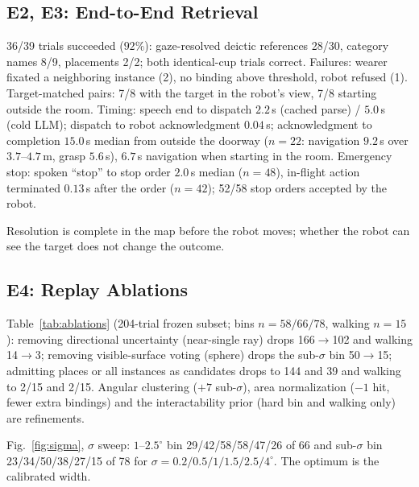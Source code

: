 \subsection{E2, E3: End-to-End Retrieval}
\label{sec:end_to_end_results}

36/39 trials succeeded ($92\%$): gaze-resolved deictic references
28/30, category names 8/9, placements 2/2; both identical-cup
trials correct. Failures: wearer fixated a neighboring instance
(2), no binding above threshold, robot refused (1). Target-matched
pairs: 7/8 with the target in the robot's view, 7/8 starting outside
the room. Timing: speech end to dispatch $2.2$\,s (cached parse) / $5.0$\,s
(cold LLM); dispatch to robot acknowledgment $0.04$\,s; acknowledgment
to completion $15.0$\,s median from outside the doorway ($n{=}22$:
navigation $9.2$\,s over $3.7$--$4.7$\,m, grasp $5.6$\,s), $6.7$\,s
navigation when starting in the room. Emergency stop: spoken
``stop'' to stop order $2.0$\,s median ($n{=}48$), in-flight action
terminated $0.13$\,s after the order ($n{=}42$); 52/58 stop orders
accepted by the robot.

Resolution is complete in the map before the robot moves; whether
the robot can see the target does not change the outcome.

\subsection{E4: Replay Ablations}
\label{sec:ablation_results}

Table~\ref{tab:ablations} (204-trial frozen subset; bins
$n=58/66/78$, walking $n=15$): removing directional uncertainty
(near-single ray) drops 166$\to$102 and walking 14$\to$3; removing
visible-surface voting (sphere) drops the sub-$\sigma$ bin 50$\to$15;
admitting places or all instances as candidates drops to 144 and 39
and walking to 2/15 and 2/15. Angular clustering ($+7$ sub-$\sigma$),
area normalization ($-1$ hit, fewer extra bindings) and the
interactability prior (hard bin and walking only) are refinements.

Fig.~\ref{fig:sigma}, $\sigma$ sweep: $1$--$2.5^\circ$ bin
29/42/58/58/47/26 of 66 and sub-$\sigma$ bin 23/34/50/38/27/15 of 78
for $\sigma=0.2/0.5/1/1.5/2.5/4^\circ$. The optimum is the calibrated
width.

